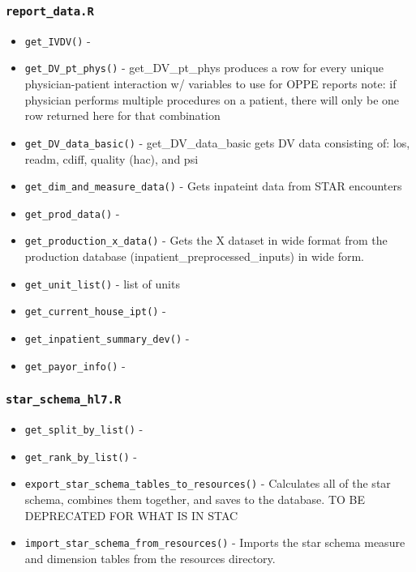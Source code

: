 \documentclass[
]{book}
\providecommand{\tightlist}{%
  \setlength{\itemsep}{0pt}\setlength{\parskip}{0pt}}
\begin{document}
\hypertarget{report_data.r-1}{%
\subsubsection{\texorpdfstring{\texttt{report\_data.R}}{report\_data.R}}\label{report_data.r-1}}

\begin{itemize}
\tightlist
\item
  \texttt{get\_IVDV()} -
\item
  \texttt{get\_DV\_pt\_phys()} - get\_DV\_pt\_phys produces a row for every unique physician-patient interaction w/ variables to use for OPPE reports note: if physician performs multiple procedures on a patient, there will only be one row returned here for that combination
\item
  \texttt{get\_DV\_data\_basic()} - get\_DV\_data\_basic gets DV data consisting of: los, readm, cdiff, quality (hac), and psi
\item
  \texttt{get\_dim\_and\_measure\_data()} - Gets inpateint data from STAR encounters
\item
  \texttt{get\_prod\_data()} -
\item
  \texttt{get\_production\_x\_data()} - Gets the X dataset in wide format from the production database (inpatient\_preprocessed\_inputs) in wide form.
\item
  \texttt{get\_unit\_list()} - list of units
\item
  \texttt{get\_current\_house\_ipt()} -
\item
  \texttt{get\_inpatient\_summary\_dev()} -
\item
  \texttt{get\_payor\_info()} -
\end{itemize}

\hypertarget{star_schema_hl7.r}{%
\subsubsection{\texorpdfstring{\texttt{star\_schema\_hl7.R}}{star\_schema\_hl7.R}}\label{star_schema_hl7.r}}

\begin{itemize}
\tightlist
\item
  \texttt{get\_split\_by\_list()} -
\item
  \texttt{get\_rank\_by\_list()} -
\item
  \texttt{export\_star\_schema\_tables\_to\_resources()} - Calculates all of the star schema, combines them together, and saves to the database. TO BE DEPRECATED FOR WHAT IS IN STAC
\item
  \texttt{import\_star\_schema\_from\_resources()} - Imports the star schema measure and dimension tables from the resources directory.
\end{itemize}
\end{document}
